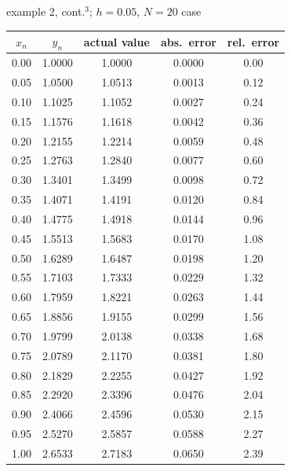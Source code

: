 \documentclass{beamer}
\begin{document}
\begin{frame}{example 2, cont.$^3$; $h=0.05$, $N=20$ case}

\scriptsize
\begin{tabular}{ccccc}
$x_n$ & $y_n$ & actual value & abs.~error & rel.~error \\ \hline
0.00 & 1.0000 & 1.0000 & 0.0000 & 0.00 \\
0.05 & 1.0500 & 1.0513 & 0.0013 & 0.12 \\
0.10 & 1.1025 & 1.1052 & 0.0027 & 0.24 \\
0.15 & 1.1576 & 1.1618 & 0.0042 & 0.36 \\
0.20 & 1.2155 & 1.2214 & 0.0059 & 0.48 \\
0.25 & 1.2763 & 1.2840 & 0.0077 & 0.60 \\
0.30 & 1.3401 & 1.3499 & 0.0098 & 0.72 \\
0.35 & 1.4071 & 1.4191 & 0.0120 & 0.84 \\
0.40 & 1.4775 & 1.4918 & 0.0144 & 0.96 \\
0.45 & 1.5513 & 1.5683 & 0.0170 & 1.08 \\
0.50 & 1.6289 & 1.6487 & 0.0198 & 1.20 \\
0.55 & 1.7103 & 1.7333 & 0.0229 & 1.32 \\
0.60 & 1.7959 & 1.8221 & 0.0263 & 1.44 \\
0.65 & 1.8856 & 1.9155 & 0.0299 & 1.56 \\
0.70 & 1.9799 & 2.0138 & 0.0338 & 1.68 \\
0.75 & 2.0789 & 2.1170 & 0.0381 & 1.80 \\
0.80 & 2.1829 & 2.2255 & 0.0427 & 1.92 \\
0.85 & 2.2920 & 2.3396 & 0.0476 & 2.04 \\
0.90 & 2.4066 & 2.4596 & 0.0530 & 2.15 \\
0.95 & 2.5270 & 2.5857 & 0.0588 & 2.27 \\
1.00 & 2.6533 & 2.7183 & 0.0650 & 2.39
\end{tabular}
\end{frame}
\end{document}
